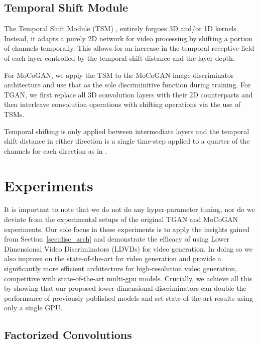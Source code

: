 \documentclass[a4paper,fleqn]{cas-sc}
\begin{document}
\subsection{Temporal Shift Module}
The Temporal Shift Module (TSM) \cite{linGHtsm}, entirely forgoes 3D and/or 1D kernels. Instead, it adapts a purely 2D network for video processing by shifting a portion of channels temporally. This allows for an increase in the temporal receptive field of each layer controlled by the temporal shift distance and the layer depth. 

For MoCoGAN, we apply the TSM to the MoCoGAN image discriminator architecture and use that as the sole discriminitive function during training. For TGAN, we first replace all 3D convolution layers with their 2D counterparts and then interleave convolution operations with shifting operations via the use of TSMs.

Temporal shifting is only applied between intermediate layers and the temporal shift distance in either direction is a single time-step applied to a quarter of the channels for each direction as in \cite{linGHtsm}.


\section{Experiments}
\label{sec:experiments}
It is important to note that we do not do any hyper-parameter tuning, nor do we deviate from the experimental setups of the original TGAN and MoCoGAN experiments. Our sole focus in these experiments is to apply the insights gained from Section~\ref{sec:disc_arch} and demonstrate the efficacy of using Lower Dimensional Video Discriminators (LDVDs) for video generation. In doing so we also improve on the state-of-the-art for video generation and provide a significantly more efficient architecture for high-resolution video generation, competitive with state-of-the-art multi-gpu models. Crucially, we achieve all this by showing that our proposed lower dimensional discriminators can double the performance of previously published models and set state-of-the-art results using only a single GPU. 


\subsection{Factorized Convolutions}
\end{document}

